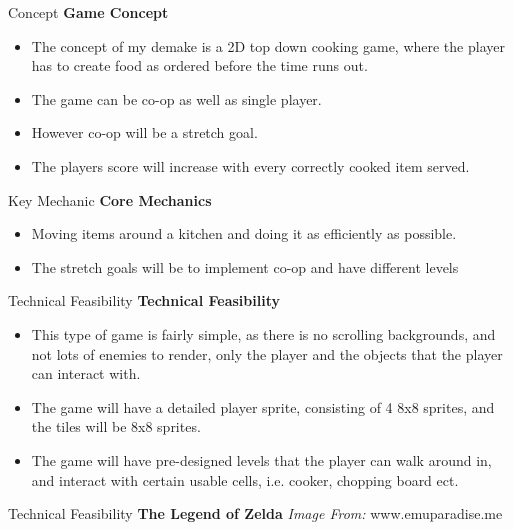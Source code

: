 \documentclass{beamer}
\begin{document}
\begin{frame}{Concept}		
	\textbf{Game Concept} \pause
		\begin{itemize}
			\item The concept of my demake is a 2D top down cooking game, where the player has to create food as ordered before the time runs out. \pause
			\item The game can be co-op as well as single player. \pause
			\item However co-op will be a stretch goal. \pause
			\item The players score will increase with every correctly cooked item served. \pause
			
		\end{itemize}
\end{frame}

\begin{frame}{Key Mechanic}		
	\textbf{Core Mechanics} \pause
		\begin{itemize}
			\item Moving items around a kitchen and doing it as efficiently as possible.  \pause
			\item The stretch goals will be to implement co-op and have different levels \pause
			

		\end{itemize}
\end{frame}

\begin{frame}{Technical Feasibility}		
	\textbf{Technical Feasibility} \pause
	
		\begin{itemize}
			\item This type of game is fairly simple, as there is no scrolling backgrounds, and not lots of enemies to render, only the player and the objects that the player can interact with. \pause
			\item The game will have a detailed player sprite, consisting of 4 8x8 sprites, and the tiles will be 8x8 sprites.  \pause
			\item The game will have pre-designed levels that the player can walk around in, and interact with certain usable cells, i.e. cooker, chopping board ect. \pause
			
		\end{itemize}
\end{frame}

\begin{frame}{Technical Feasibility}
    \textbf{The Legend of Zelda}
    \textit{Image From:} www.emuparadise.me
\end{frame}
\end{document}

